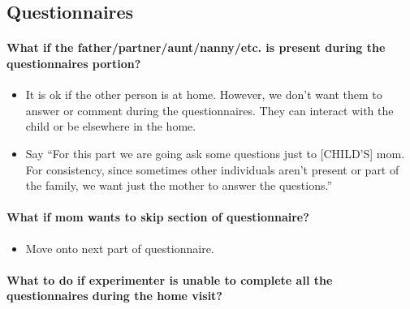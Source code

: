 \documentclass[
  12pt,
]{book}
\providecommand{\tightlist}{%
  \setlength{\itemsep}{0pt}\setlength{\parskip}{0pt}}
\begin{document}
\hypertarget{faqs_questionnaires}{%
\subsection{Questionnaires}\label{faqs_questionnaires}}

\hypertarget{what-if-the-fatherpartnerauntnannyetc.-is-present-during-the-questionnaires-portion}{%
\paragraph*{What if the father/partner/aunt/nanny/etc. is present during the questionnaires portion?}\label{what-if-the-fatherpartnerauntnannyetc.-is-present-during-the-questionnaires-portion}}

\begin{itemize}
\tightlist
\item
  It is ok if the other person is at home. However, we don't want them to answer or comment during the questionnaires. They can interact with the child or be elsewhere in the home.
\item
  Say ``For this part we are going ask some questions just to {[}CHILD'S{]} mom. For consistency, since sometimes other individuals aren't present or part of the family, we want just the mother to answer the questions.''
\end{itemize}

\hypertarget{what-if-mom-wants-to-skip-section-of-questionnaire}{%
\paragraph*{What if mom wants to skip section of questionnaire?}\label{what-if-mom-wants-to-skip-section-of-questionnaire}}

\begin{itemize}
\tightlist
\item
  Move onto next part of questionnaire.
\end{itemize}

\hypertarget{what-to-do-if-experimenter-is-unable-to-complete-all-the-questionnaires-during-the-home-visit}{%
\paragraph*{What to do if experimenter is unable to complete all the questionnaires during the home visit?}\label{what-to-do-if-experimenter-is-unable-to-complete-all-the-questionnaires-during-the-home-visit}}
\end{document}
